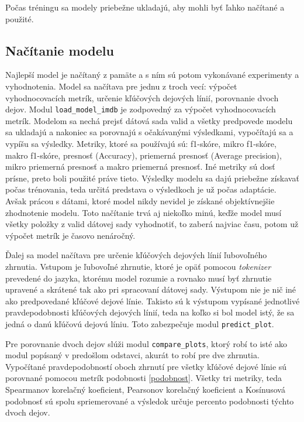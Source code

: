 Počas tréningu sa modely priebežne ukladajú, aby mohli byť ľahko načítané a použité.

\subsection*{Načítanie modelu}

Najlepší model je načítaný z pamäte a s ním sú potom vykonávané experimenty a vyhodnotenia. Model sa načítava pre jednu z troch vecí: výpočet vyhodnocovacích metrík, určenie kľúčových dejových línií, porovnanie dvoch dejov. Modul {\tt load\_model\_imdb} je zodpovedný za výpočet vyhodnocovacích metrík. Modelom sa nechá prejsť dátová sada valid a všetky predpovede modelu sa ukladajú a nakoniec sa porovnajú s očakávanými výsledkami, vypočítajú sa a vypíšu sa výsledky. Metriky, ktoré sa používajú sú: f1-skóre, mikro f1-skóre, makro f1-skóre, presnosť (Accuracy), priemerná presnosť (Average precision), mikro priemerná presnosť a makro priemerná presnosť. Iné metriky sú dosť prísne, preto boli použité práve tieto. Výsledky modelu sa dajú priebežne získavať počas trénovania, teda určitá predstava o výsledkoch je už počas adaptácie. Avšak prácou s dátami, ktoré model nikdy nevidel je získané objektívnejšie zhodnotenie modelu. Toto načítanie trvá aj niekoľko minú, keďže model musí všetky položky z valid dátovej sady vyhodnotiť, to zaberá najviac času, potom už výpočet metrík je časovo nenáročný. 

Ďalej sa model načítava pre určenie kľúčových dejových línií ľubovoľného zhrnutia. Vstupom je ľubovoľné zhrnutie, ktoré je opäť pomocou \textit{tokenizer} prevedené do jazyka, ktorému model rozumie a rovnako musí byť zhrnutie upravené a skrátené tak ako pri spracovaní dátovej sady. Výstupom nie je nič iné ako predpovedané kľúčové dejové línie. Takisto sú k výstupom vypísané jednotlivé pravdepodobnosti kľúčových dejových línií, teda na koľko si bol model istý, že sa jedná o danú kľúčovú dejovú líniu. Toto zabezpečuje modul {\tt predict\_plot}.

Pre porovnanie dvoch dejov slúži modul {\tt compare\_plots}, ktorý robí to isté ako modul popísaný v predošlom odstavci, akurát to robí pre dve zhrnutia. Vypočítané pravdepodobností oboch zhrnutí pre všetky kľúčové dejové línie sú porovnané pomocou metrík podobnosti \ref{podobnost}. Všetky tri metriky, teda Spearmanov korelačný koeficient, Pearsonov korelačný koeficient a Kosínusová podobnosť sú spolu spriemerované a výsledok určuje percento podobnosti týchto dvoch dejov.


